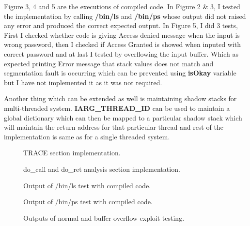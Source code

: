 \documentclass[a4paper, 11pt]{article}
\begin{document}
Figure 3, 4 and 5 are the executions of compiled code. In Figure 2 \& 3, I tested the implementation by calling \textbf{/bin/ls} and \textbf{/bin/ps} whose output did not raised any error and produced the correct expected output. In Figure 5, I did 3 tests, First I checked whether code is giving Access denied message when the input is wrong password, then I checked if Access Granted is showed when inputed with correct password and at last I tested by overflowing the input buffer. Which as expected printing Error message that stack values does not match and segmentation fault is occurring which can be prevented using \textbf{isOkay} variable but I have not implemented it as it was not required.

Another thing which can be extended as well is maintaining shadow stacks for multi-threaded system. 
\textbf{IARG\_THREAD\_ID} can be used to maintain a global dictionary which can then be mapped to a particular shadow stack which will maintain the return address for that particular thread and rest of the implementation is same as for a single threaded system.   

\begin{figure}
	\centering
	\caption{TRACE section implementation.}
\end{figure}
\begin{figure}
	\centering
	\caption{do\_call and do\_ret analysis section implementation.}
\end{figure}
\begin{figure}
	\centering
	\caption{Output of /bin/ls test with compiled code.}
\end{figure}
\begin{figure}
	\centering
	\caption{Output of /bin/ps test with compiled code.}
\end{figure}
\begin{figure}
	\centering
	\caption{Outputs of normal and buffer overflow exploit testing.}
\end{figure}
\newpage
\end{document}

